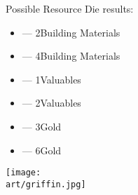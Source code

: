 \begin{multicols}{2}
Possible Resource Die  results:
\medskip
\begin{itemize}
  \setlength\itemsep{8pt}
  \item[{}] — 2\texttimes Building Materials
  \item[{}] — 4\texttimes Building Materials
  \item[{}] — 1\texttimes Valuables
  \item[{}] — 2\texttimes Valuables
  \item[{}] — 3\texttimes Gold
  \item[{}] — 6\texttimes Gold
\end{itemize}


\end{multicols}

\vspace*{\fill}

\begin{scaledfigure}[blanker]
  \centering
  \texttt{[image: \\art/griffin.jpg]}
\end{scaledfigure}
